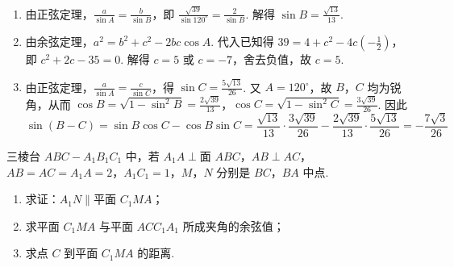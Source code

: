 \begin{solution}
\begin{enumerate}
\item 由正弦定理，\(\frac{a}{\sin A}=\frac{b}{\sin B}\)，即 \(\frac{\sqrt{39}}{\sin 120^\circ}=\frac{2}{\sin B}\). 解得
\(\sin B=\frac{\sqrt{13}}{13}\).

\item 由余弦定理，\(a^2=b^2+c^2-2bc\cos A\). 代入已知得 \(39=4+c^2-4c\left( -\frac{1}{2} \right)\)，即 \(c^2+2c-35=0\). 解得 \(c=5\) 或 \(c=-7\)，舍去负值，故 \(c=5\).

\item 由正弦定理，\(\frac{a}{\sin A}=\frac{c}{\sin C}\)，得
\(\sin C=\frac{5\sqrt{13}}{26}\).
又 \(A=120^\circ\)，故 \(B\)，\(C\) 均为锐角，从而
\(\cos B=\sqrt{1-\sin^2 B}=\frac{2\sqrt{39}}{13}\)，\(\cos C=\sqrt{1-\sin^2 C}=\frac{3\sqrt{39}}{26}\).
因此
\[
\sin(B-C)
=\sin B\cos C-\cos B\sin C
=\frac{\sqrt{13}}{13}\cdot \frac{3\sqrt{39}}{26}-\frac{2\sqrt{39}}{13}\cdot \frac{5\sqrt{13}}{26}
=-\frac{7\sqrt3}{26}
\]
\end{enumerate}
\end{solution}

\begin{problem}
三棱台 \(ABC-A_1B_1C_1\) 中，若 \(A_1A\perp \text{面 }ABC\)，\(AB\perp AC\)，\(AB=AC=A_1A=2\)，\(A_1C_1=1\)，\(M\)，\(N\) 分别是 \(BC\)，\(BA\) 中点.

\begin{enumerate}
\item 求证：\(A_1N\parallel \text{平面 }C_1MA\)；
\item 求平面 \(C_1MA\) 与平面 \(ACC_1A_1\) 所成夹角的余弦值；
\item 求点 \(C\) 到平面 \(C_1MA\) 的距离.
\end{enumerate}

\end{problem}

